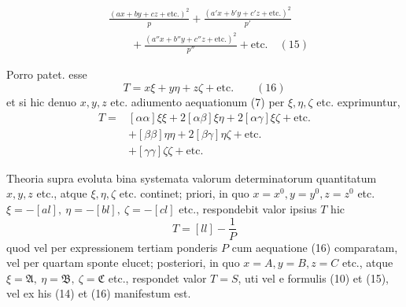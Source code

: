 \[
\begin{aligned}&\frac{(ax+by+cz+\text{etc.})^2}{p}+\frac{(a'x+b'y+c'z+\text{etc.})^2}{p'}\\&\qquad+\frac{(a''x+b''y+c''z+\text{etc.})^2}{p''}+\text{etc.}\quad(15)\end{aligned}
\]

Porro patet. esse
\[
T=x\xi+y\eta+z\zeta+\text{etc.}\qquad(16)
\]
et si hic denuo \(x,y,z\) etc. adiumento aequationum (7) per \(\xi,\eta,\zeta\) etc. exprimuntur,
\[
\begin{aligned}
T={}&[\alpha\alpha]\xi\xi+2[\alpha\beta]\xi\eta+2[\alpha\gamma]\xi\zeta+\text{etc.}\\&+[\beta\beta]\eta\eta+2[\beta\gamma]\eta\zeta+\text{etc.}\\
&+[\gamma\gamma]\zeta\zeta+\text{etc.}
\end{aligned}
\]

Theoria supra evoluta bina systemata valorum determinatorum quantitatum \(x,y,z\) etc., atque \(\xi,\eta,\zeta\) etc. continet; priori, in quo \(x=x^0,y=y^0,z=z^0\) etc. \(\xi=-[al],\ \eta=-[bl],\ \zeta=-[cl]\) etc., respondebit valor ipsius \(T\) hic
\[
T=[ll]-\frac1P
\]
quod vel per expressionem tertiam ponderis \(P\) cum aequatione (16) comparatam, vel per quartam sponte elucet; posteriori, in quo \(x=A,y=B,z=C\) etc., atque \(\xi=\mathfrak A,\ \eta=\mathfrak B,\ \zeta=\mathfrak C\) etc., respondet valor \(T=S\), uti vel e formulis (10) et (15), vel ex his (14) et (16) manifestum est.

